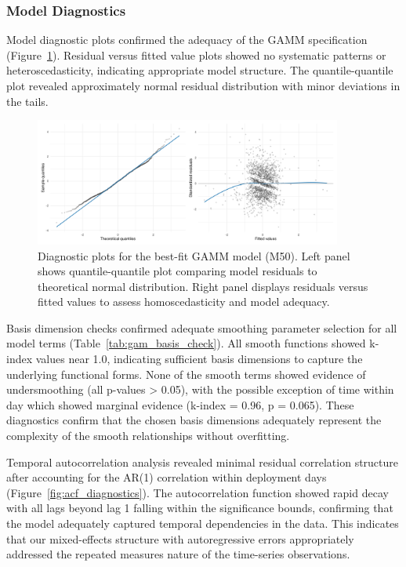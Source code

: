 \subsubsection{Model Diagnostics}

Model diagnostic plots confirmed the adequacy of the GAMM specification (Figure~\ref{fig:model_diagnostics_30min}). Residual versus fitted value plots showed no systematic patterns or heteroscedasticity, indicating appropriate model structure. The quantile-quantile plot revealed approximately normal residual distribution with minor deviations in the tails.

\begin{figure}[htbp]
    \centering
    \includegraphics[width=0.9\textwidth]{supplemental/results/30_min/figures/diag_qq_and_residuals_1x2.png}
    \caption{Diagnostic plots for the best-fit GAMM model (M50). Left panel shows quantile-quantile plot comparing model residuals to theoretical normal distribution. Right panel displays residuals versus fitted values to assess homoscedasticity and model adequacy.}
    \label{fig:model_diagnostics_30min}
\end{figure}

Basis dimension checks confirmed adequate smoothing parameter selection for all model terms (Table~\ref{tab:gam_basis_check}). All smooth functions showed k-index values near 1.0, indicating sufficient basis dimensions to capture the underlying functional forms. None of the smooth terms showed evidence of undersmoothing (all p-values > 0.05), with the possible exception of time within day which showed marginal evidence (k-index = 0.96, p = 0.065). These diagnostics confirm that the chosen basis dimensions adequately represent the complexity of the smooth relationships without overfitting.



Temporal autocorrelation analysis revealed minimal residual correlation structure after accounting for the AR(1) correlation within deployment days (Figure~\ref{fig:acf_diagnostics}). The autocorrelation function showed rapid decay with all lags beyond lag 1 falling within the significance bounds, confirming that the model adequately captured temporal dependencies in the data. This indicates that our mixed-effects structure with autoregressive errors appropriately addressed the repeated measures nature of the time-series observations.

